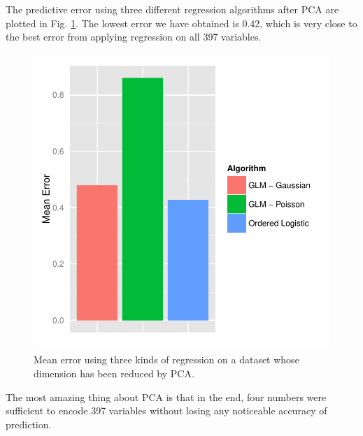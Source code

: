 The predictive error using three different regression algorithms after PCA are plotted in Fig. \ref{linear_plus_pca}. The lowest error we have obtained is 0.42, which is very close to the best error from applying regression on all 397 variables. 

\begin{figure}
\centering
\includegraphics[scale=0.5]{linear_plus_pca.pdf}
\caption{Mean error using three kinds of regression on a dataset whose dimension has been reduced by PCA.}
\label{linear_plus_pca}
\end{figure}

The most amazing thing about PCA is that in the end, four numbers were sufficient to encode 397 variables without losing any noticeable accuracy of prediction.